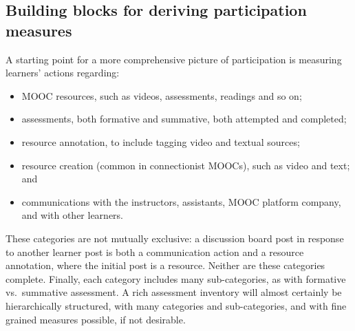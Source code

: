 \subsection{Building blocks for deriving participation measures}

A starting point for a more comprehensive picture of
participation is measuring learners' actions regarding: 

\begin{itemize}

\item MOOC resources,
such as videos, assessments, readings and so on;

\item assessments, both
formative and summative, both attempted and completed; 

\item resource
annotation, to include tagging video and textual sources; 

\item resource
creation (common in connectionist MOOCs), such as video and text; and

\item communications with the instructors, assistants, MOOC platform company,
and with other learners.

\end{itemize}


These categories are not mutually exclusive:  a discussion board
post in response to another learner post is both a communication action
and a resource annotation, where the initial post
is a resource.  Neither are these categories
complete. Finally, each category includes many
sub-categories, as with  formative vs.\ summative
assessment. A rich assessment inventory will almost certainly be
hierarchically structured, with many categories and sub-categories, and
with fine grained measures possible, if not desirable.

